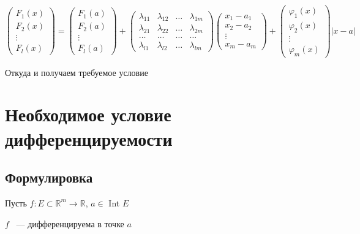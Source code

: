 \documentclass{article}
\begin{document}
\begin{enumerate}
                    $\begin{pmatrix} F_1(x) \\ F_2(x) \\ \vdots \\ F_l(x) \end{pmatrix} = \begin{pmatrix} F_1(a) \\ F_2(a) \\ \vdots \\ F_l(a) \end{pmatrix} + \begin{pmatrix} \lambda_{11} & \lambda_{12} & \ldots & \lambda_{1m} \\ \lambda_{21} & \lambda_{22} & \ldots & \lambda_{2m} \\ \ldots & \ldots & \ldots & \ldots \\ \lambda_{l1} & \lambda_{l2} & \ldots & \lambda_{lm} \end{pmatrix} \begin{pmatrix} x_1 - a_1 \\ x_2 - a_2 \\ \vdots \\ x_m - a_m \end{pmatrix} + \begin{pmatrix} \varphi_1(x) \\ \varphi_2(x) \\ \vdots \\ \varphi_m(x) \end{pmatrix} |x - a|$
                    
                    Откуда и получаем требуемое условие
                    
            \end{enumerate}

    \newpage
    
    \section{Необходимое условие дифференцируемости}
    
        \subsection{Формулировка}
        
            Пусть $f : E \subset \mathbb{R}^m \rightarrow \mathbb{R}$, $a \in$ Int $E$
            
            $f$ ~--- дифференцируема в точке $a$
            
\end{document}
